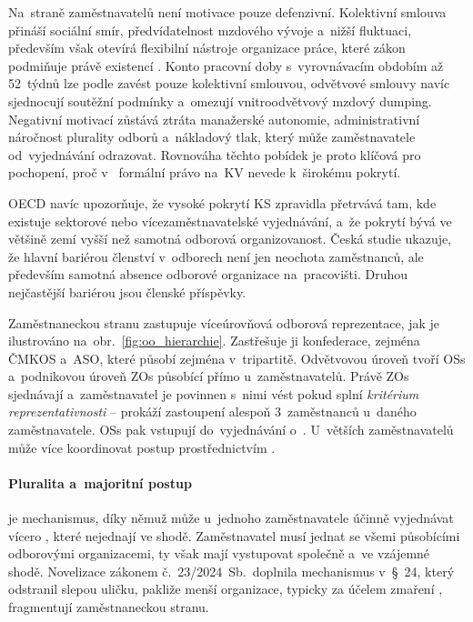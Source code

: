 Na~straně zaměstnavatelů není motivace pouze defenzivní. Kolektivní smlouva přináší sociální smír, předvídatelnost mzdového vývoje a~nižší fluktuaci, především však otevírá flexibilní nástroje organizace práce, které zákon podmiňuje právě existencí . Konto pracovní doby s~vyrovnávacím obdobím až 52~týdnů lze podle  zavést pouze kolektivní smlouvou, odvětvové smlouvy navíc sjednocují soutěžní podmínky a~omezují vnitroodvětvový mzdový dumping. Negativní motivací zůstává ztráta manažerské autonomie, administrativní náročnost plurality odborů a~nákladový tlak, který může zaměstnavatele od~vyjednávání odrazovat. Rovnováha těchto pobídek je proto klíčová pro pochopení, proč v~ formální právo na~\ac{KV} nevede k~širokému pokrytí.~\cite{zakon_zp_2006}~\cite{CMKOS_ZpravaKV2025}\par

\Ac{OECD} navíc upozorňuje, že vysoké pokrytí \acs{KS} zpravidla přetrvává tam, kde existuje sektorové nebo vícezaměstnavatelské vyjednávání, a~že pokrytí bývá ve většině zemí vyšší než samotná odborová organizovanost. Česká studie  ukazuje, že hlavní bariérou členství v~odborech není jen neochota zaměstnanců, ale především samotná absence odborové organizace na~pracovišti. Druhou nejčastější bariérou jsou členské příspěvky.~\cite{OECD_UnionEmployerCoverage_2025}~\cite{Kroupa_MoznostiZvysovaniKapacitOdboru2024}\par

Zaměstnaneckou stranu zastupuje víceúrovňová odborová reprezentace, jak je ilustrováno na~obr.~\ref{fig:oo_hierarchie}. Zastřešuje ji konfederace, zejména \ac{ČMKOS} a~\ac{ASO}, které působí zejména v~tripartitě. Odvětvovou úroveň tvoří \acp{OS} a~podnikovou úroveň \acp{ZO} působící přímo u~zaměstnavatelů. Právě \acp{ZO} sjednávají  a~zaměstnavatel je povinnen s~nimi vést  pokud splní \textit{kritérium reprezentativnosti} -- prokáží zastoupení alespoň 3~zaměstnanců u~daného zaměstnavatele. \acp{OS} pak vstupují do~vyjednávání o~. U~větších zaměstnavatelů může více  koordinovat postup prostřednictvím .\par



\paragraph{Pluralita a~majoritní postup} je mechanismus, díky němuž může u~jednoho zaměstnavatele účinně vyjednávat vícero , které nejednají ve shodě. Zaměstnavatel musí jednat se všemi působícími odborovými organizacemi, ty však mají vystupovat společně a~ve vzájemné shodě. Novelizace  zákonem č.~23/2024~Sb.~doplnila mechanismus v~\S~24, který odstranil slepou uličku, pakliže menší organizace, typicky za účelem zmaření , fragmentují zaměstnaneckou stranu.~\cite{zakon_zp_2006}~\cite{zakon_23_2024}\par

